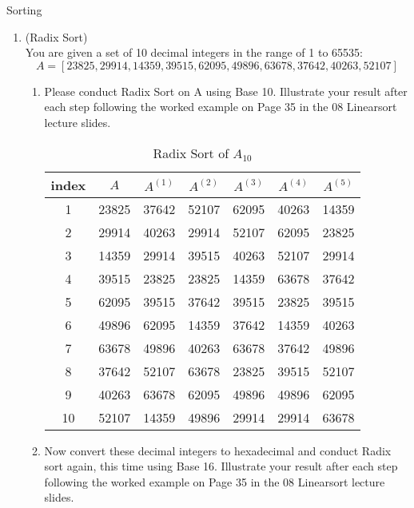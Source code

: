 \documentclass{article}
\begin{document}
\begin{section}{Sorting}
\begin{enumerate}
    \item (Radix Sort) \\
    You are given a set of 10 decimal integers in the range of 1 to 65535:
    $$
    A = [23825, 29914, 14359, 39515, 62095, 49896, 63678, 37642, 40263, 52107]
    $$
    
    \begin{enumerate}
        \item Please conduct Radix Sort on A using Base 10. Illustrate your result after each step following the worked example on Page 35 in the 08 Linearsort lecture slides.
        
        \begin{table}[h]
            \centering
            \begin{tabular}{|c||c|c|c|c|c|c|}
                \hline 
                index & $A$ & $A^{(1)}$ & $A^{(2)}$ & $A^{(3)}$ & $A^{(4)}$ & $A^{(5)}$ \\
                \hline
                 1 & 23825 & 37642 & 52107 & 62095 & 40263 & 14359 \\
                 2 & 29914 & 40263 & 29914 & 52107 & 62095 & 23825 \\
                 3 & 14359 & 29914 & 39515 & 40263 & 52107 & 29914 \\
                 4 & 39515 & 23825 & 23825 & 14359 & 63678 & 37642 \\
                 5 & 62095 & 39515 & 37642 & 39515 & 23825 & 39515 \\
                 6 & 49896 & 62095 & 14359 & 37642 & 14359 & 40263 \\
                 7 & 63678 & 49896 & 40263 & 63678 & 37642 & 49896 \\
                 8 & 37642 & 52107 & 63678 & 23825 & 39515 & 52107 \\
                 9 & 40263 & 63678 & 62095 & 49896 & 49896 & 62095 \\
                10 & 52107 & 14359 & 49896 & 29914 & 29914 & 63678 \\
                \hline
            \end{tabular}
            \caption{Radix Sort of $A_{10}$}
            \label{tab:Radix Sort}
        \end{table}
        
        \item Now convert these decimal integers to hexadecimal and conduct Radix sort again, this time using Base 16. Illustrate your result after each step following the worked example on Page 35 in the 08 Linearsort lecture slides.
        

\end{enumerate}
\end{enumerate}
\end{section}
\end{document}
